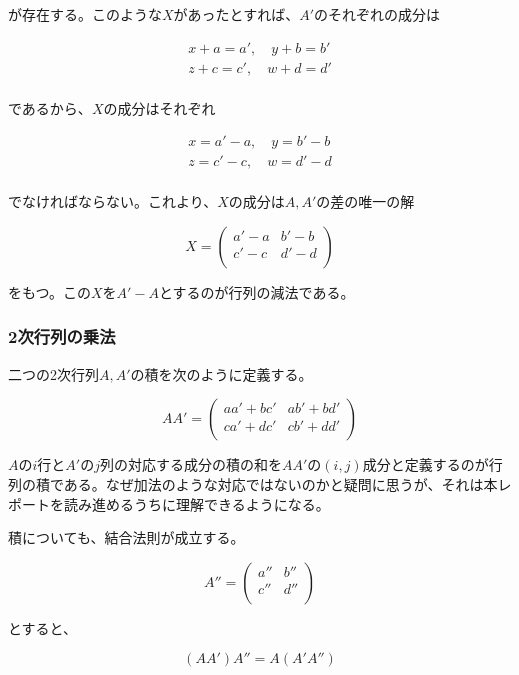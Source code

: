 \documentclass[dvipdfmx,autodetect-engine]{jsarticle}
\begin{document}
が存在する。このような$X$があったとすれば、$A'$のそれぞれの成分は

\begin{eqnarray*}
x + a = a', \quad y + b = b' \\
z + c = c', \quad w + d = d' \\
\end{eqnarray*}

であるから、$X$の成分はそれぞれ

\begin{eqnarray*}
x = a' - a, \quad y = b' - b \\
z = c' - c, \quad w = d' - d \\
\end{eqnarray*}

でなければならない。これより、$X$の成分は$A, A'$の差の唯一の解


$$
X = \begin{pmatrix}
a' - a & b' - b \\
c' - c & d' - d \\
\end{pmatrix}
$$

をもつ。この$X$を$A'-A$とするのが行列の減法である。

\subsubsection{2次行列の乗法}\label{subsubsection:matrixMultiple}

二つの2次行列$A, A'$の積を次のように定義する。

$$
AA' = \begin{pmatrix}
aa' + bc' & ab' + bd' \\
ca' + dc' & cb' + dd' \\
\end{pmatrix}
$$

$A$の$i$行と$A'$の$j$列の対応する成分の積の和を$AA'$の$(i, j)$成分と定義するのが行列の積である。なぜ加法のような対応ではないのかと疑問に思うが、それは本レポートを読み進めるうちに理解できるようになる。

積についても、結合法則が成立する。

$$
A'' = \begin{pmatrix}
a'' & b'' \\
c'' & d'' \\
\end{pmatrix}
$$

とすると、

$$
(AA')A'' = A(A'A'')
$$
\end{document}

